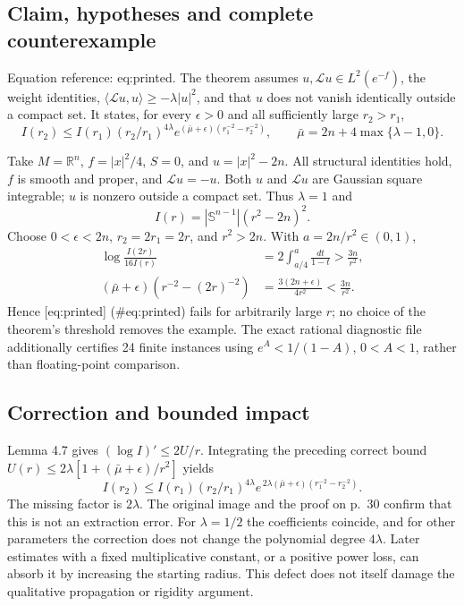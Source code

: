 \documentclass[10pt]{article}
\begin{document}
\subsection*{Claim, hypotheses and complete counterexample}
Equation reference: eq:printed. The theorem assumes \(u,\mathcal Lu\in L^2(e^{-f})\), the weight identities, \(\langle\mathcal Lu,u\rangle\ge-\lambda|u|^2\), and that \(u\) does not vanish identically outside a compact set. It states, for every \(\epsilon>0\) and all sufficiently large \(r_2>r_1\), \[
 I(r_2)\le I(r_1)(r_2/r_1)^{4\lambda}
 e^{(\bar\mu+\epsilon)(r_1^{-2}-r_2^{-2})},
 \qquad \bar\mu=2n+4\max\{\lambda-1,0\}.\]\par
Take \(M=\mathbb R^n\), \(f=|x|^2/4\), \(S=0\), and \(u=|x|^2-2n\). All structural identities hold, \(f\) is smooth and proper, and \(\mathcal Lu=-u\). Both \(u\) and \(\mathcal Lu\) are Gaussian square integrable; \(u\) is nonzero outside a compact set. Thus \(\lambda=1\) and \[I(r)=|\mathbb S^{n-1}|(r^2-2n)^2.\] Choose \(0<\epsilon<2n\), \(r_2=2r_1=2r\), and \(r^2>2n\). With \(a=2n/r^2\in(0,1)\), \[\begin{aligned}
 \log\frac{I(2r)}{16I(r)}
 &=2\int_{a/4}^a\frac{dt}{1-t}
 >\frac{3n}{r^2},\\
 (\bar\mu+\epsilon)(r^{-2}-(2r)^{-2})
 &=\frac{3(2n+\epsilon)}{4r^2}
 <\frac{3n}{r^2}.\end{aligned}\] Hence [eq:printed] (\#eq:printed) fails for arbitrarily large \(r\); no choice of the theorem’s threshold removes the example. The exact rational diagnostic file additionally certifies 24 finite instances using \(e^A<1/(1-A)\), \(0<A<1\), rather than floating-point comparison.\par
\subsection*{Correction and bounded impact}
Lemma 4.7 gives \((\log I)'\le2U/r\). Integrating the preceding correct bound \(U(r)\le2\lambda[1+(\bar\mu+\epsilon)/r^2]\) yields \[I(r_2)\le I(r_1)(r_2/r_1)^{4\lambda}
 e^{\,2\lambda(\bar\mu+\epsilon)(r_1^{-2}-r_2^{-2})}.\] The missing factor is \(2\lambda\). The original image and the proof on p. 30 confirm that this is not an extraction error. For \(\lambda=1/2\) the coefficients coincide, and for other parameters the correction does not change the polynomial degree \(4\lambda\). Later estimates with a fixed multiplicative constant, or a positive power loss, can absorb it by increasing the starting radius. This defect does not itself damage the qualitative propagation or rigidity argument.\par
\end{document}
